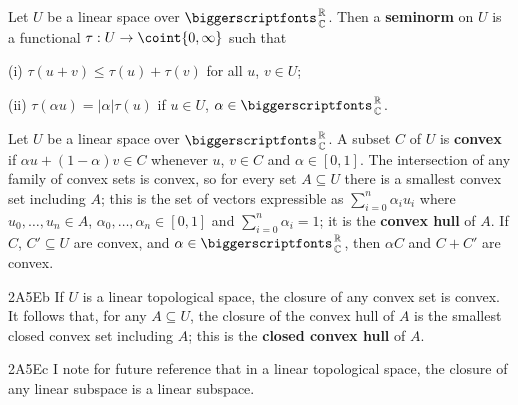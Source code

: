 
 Let $U$ be a linear space over $\RoverC$.
Then a {\bf seminorm} on $U$ is a functional $\tau:U\to\coint{0,\infty}$
such that

\quad (i) $\tau(u+v)\le\tau(u)+\tau(v)$ for all $u$, $v\in U$;

\quad (ii) $\tau(\alpha u)=|\alpha|\tau(u)$ if $u\in U$,
$\alpha\in\RoverC$.


 Let $U$ be a linear space over $\RoverC$.
A subset $C$ of $U$ is {\bf convex} if
$\alpha u+(1-\alpha)v\in C$ whenever $u$, $v\in C$ and $\alpha\in[0,1]$.
The intersection of any family of convex sets is convex, so for every
set $A\subseteq U$ there is a smallest convex set including $A$;
this is the set of vectors expressible as
$\sum_{i=0}^n\alpha_iu_i$
where $u_0,\ldots,u_n\in A$, $\alpha_0,\ldots,\alpha_n\in[0,1]$ and
$\sum_{i=0}^n\alpha_i=1$;  it
is the {\bf convex hull} of $A$.   If $C$, $C'\subseteq U$ 
are convex, and $\alpha\in\RoverC$, 
then $\alpha C$ and $C+C'$ are convex.

\spheader 2A5Eb If $U$ is a linear topological space, the closure of
any convex set is convex.   It
follows that, for any $A\subseteq U$, the closure of the convex hull of
$A$ is the smallest closed convex set including $A$;  this is the
{\bf closed convex hull} of $A$.

\spheader 2A5Ec I note for future reference that in a linear topological
space, the closure of any linear subspace is a linear subspace.


